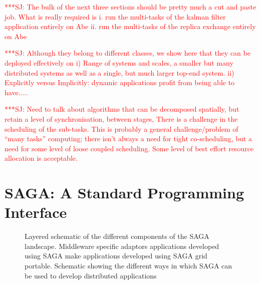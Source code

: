 \documentclass[conference,final]{IEEEtran}
\newcommand{\jhanote}[1]{ {\textcolor{red} { ***SJ: #1 }}}
\newcommand{\jhanote}[1]{}
\begin{document}
\jhanote{The bulk of the next three sections should be pretty much a
  cut and paste job. What is really required is i. run the multi-tasks
  of the kalman filter application entirely on Abe ii. run the
  multi-tasks of the replica exchange entirely on Abe}

\jhanote{Although they belong to different classes, we show here that
  they can be deployed effectively on i) Range of systems and scales,
  a smaller but many distributed systems as well as a single, but much
  larger top-end system. ii) Explicitly versus Implicitly: dynamic
  applications profit from being able to have.....}

\jhanote{Need to talk about algorithms that can be decomposed
  spatially, but retain a level of synchronisation, between stages,
  There is a challenge in the scheduling of the sub-tasks.  This is
  probably a general challenge/problem of ``many tasks'' computing;
  there isn't always a need for tight co-scheduling, but a need for
  some level of loose coupled scheduling.  Some level of best effort
  resource allocation is acceptable.}

\section{SAGA: A Standard Programming Interface}


\begin{figure}[!h]
  \begin{center}
  \end{center}
  \caption{Layered schematic of the different components of the SAGA
    landscape.  Middleware specific adaptors applications developed
    using SAGA make applications developed using SAGA grid
    portable. Schematic showing the different ways in which SAGA can
    be used to develop distributed applications}
 \label{sagalayer}
\end{figure}
\end{document}
